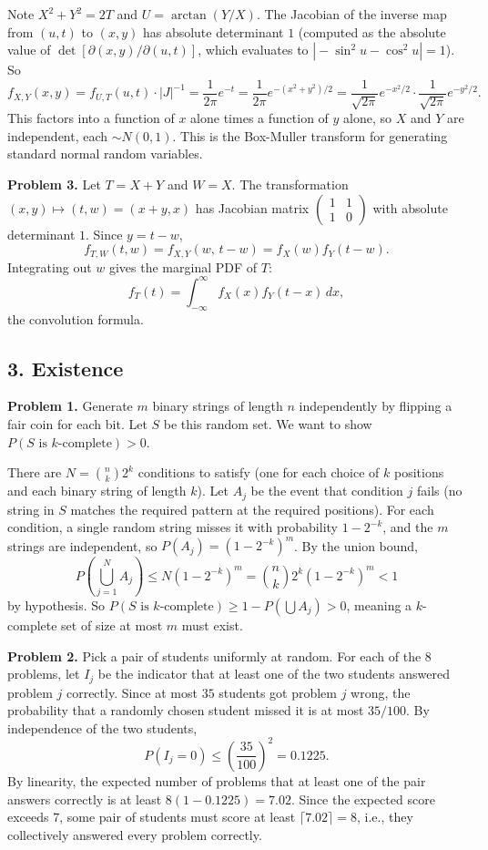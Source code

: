 \documentclass{article}
\begin{document}
Note $X^2+Y^2=2T$ and $U=\arctan(Y/X)$. The Jacobian of the inverse map from $(u,t)$ to $(x,y)$ has absolute determinant $1$ (computed as the absolute value of $\det[\partial(x,y)/\partial(u,t)]$, which evaluates to $|\!-\!\sin^2 u - \cos^2 u|=1$). So
$$
f_{X,Y}(x,y) = f_{U,T}(u,t)\cdot|J|^{-1} = \frac{1}{2\pi}e^{-t} = \frac{1}{2\pi}e^{-(x^2+y^2)/2} = \frac{1}{\sqrt{2\pi}}e^{-x^2/2}\cdot\frac{1}{\sqrt{2\pi}}e^{-y^2/2}.
$$
This factors into a function of $x$ alone times a function of $y$ alone, so $X$ and $Y$ are independent, each $\sim N(0,1)$. This is the Box-Muller transform for generating standard normal random variables.

\bigskip
\textbf{Problem 3.} Let $T=X+Y$ and $W=X$. The transformation $(x,y)\mapsto(t,w)=(x+y,x)$ has Jacobian matrix $\begin{pmatrix}1&1\\1&0\end{pmatrix}$ with absolute determinant $1$. Since $y=t-w$,
$$
f_{T,W}(t,w) = f_{X,Y}(w,\,t-w) = f_X(w)f_Y(t-w).
$$
Integrating out $w$ gives the marginal PDF of $T$:
$$
f_T(t) = \int_{-\infty}^{\infty}f_X(x)f_Y(t-x)\,dx,
$$
the convolution formula.

\subsection*{3. Existence}

\textbf{Problem 1.} Generate $m$ binary strings of length $n$ independently by flipping a fair coin for each bit. Let $S$ be this random set. We want to show $P(S\text{ is }k\text{-complete})>0$.

There are $N=\binom{n}{k}2^k$ conditions to satisfy (one for each choice of $k$ positions and each binary string of length $k$). Let $A_j$ be the event that condition $j$ fails (no string in $S$ matches the required pattern at the required positions). For each condition, a single random string misses it with probability $1-2^{-k}$, and the $m$ strings are independent, so $P(A_j)=(1-2^{-k})^m$. By the union bound,
$$
P\!\left(\bigcup_{j=1}^N A_j\right)\le N(1-2^{-k})^m = \binom{n}{k}2^k(1-2^{-k})^m < 1
$$
by hypothesis. So $P(S\text{ is }k\text{-complete})\ge1-P(\bigcup A_j)>0$, meaning a $k$-complete set of size at most $m$ must exist.

\bigskip
\textbf{Problem 2.} Pick a pair of students uniformly at random. For each of the $8$ problems, let $I_j$ be the indicator that at least one of the two students answered problem $j$ correctly. Since at most $35$ students got problem $j$ wrong, the probability that a randomly chosen student missed it is at most $35/100$. By independence of the two students,
$$
P(I_j=0) \le \left(\frac{35}{100}\right)^2 = 0.1225.
$$
By linearity, the expected number of problems that at least one of the pair answers correctly is at least $8(1-0.1225)=7.02$. Since the expected score exceeds $7$, some pair of students must score at least $\lceil 7.02\rceil=8$, i.e., they collectively answered every problem correctly.
\end{document}
